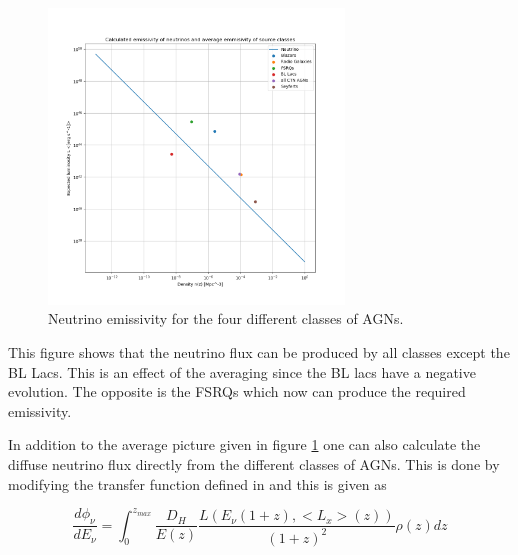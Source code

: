 \begin{figure}[H]
    \centering
    \includegraphics[width = 0.7\textwidth]{new_plots/L_n_neut_calc.png}
    \caption{Neutrino emissivity for the four different classes of AGNs.}
    \label{fig:neutrino}
\end{figure}

This figure shows that the neutrino flux can be produced by all classes except 
the BL Lacs. This is an effect of the averaging since the BL lacs have a negative evolution.
The opposite is the FSRQs which now can produce the required emissivity.

In addition to the average picture given in figure \ref*{fig:neutrino} one can also calculate the diffuse neutrino flux directly from the different classes of AGNs. This is done by modifying the transfer function defined in \cite{Palladino_2020} and this is given as


\begin{equation}
    \frac{d\phi_\nu}{dE_\nu} = \int_0^{z_{max}} \frac{D_H}{E(z)} \frac{L(E_\nu (1+z),<L_x>(z))}{(1+z)^2} \rho(z) dz
\end{equation}


